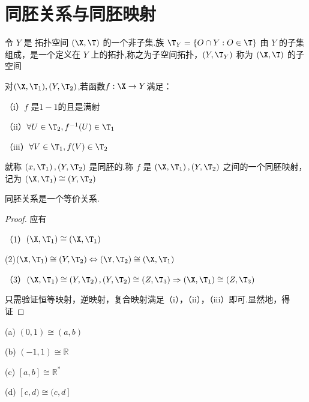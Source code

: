 \section{同胚关系与同胚映射}

\begin{definition}
	令 $Y$ 是 拓扑空间 $(\X, \T)$ 的一个非子集.族 $\T_Y=\{O \cap Y: O \in \T\}$ 由 $Y$ 的子集组成，是一个定义在 $Y$ 上的拓扑,称之为子空间拓扑，$\left(Y, \T_Y\right)$ 称为 $(\X, \T)$ 的子空间
\end{definition}
\begin{definition}
	对$(\X,\T_1),(Y,\T_2)$,若函数$f:\X\rightarrow Y$满足：
	
	（i）$f$ 是$1-1$的且是满射
	
	（ii）$\forall U \in \T_2, f^{-1}(U) \in \T_1$
	
	（iii）$\forall V \in \T_1, f(V) \in \T_2$
	
	就称 $\left(x, \T_1\right),\left(Y, \T_2\right)$ 是同胚的.称 $f$ 是 $\left(\X, \T_1\right),\left(Y, \T_2\right)$ 之间的一个同胚映射，记为 $\left(\X, \T_1\right)\cong\left(Y, \T_2\right)$
\end{definition}
\begin{proposition}
	同胚关系是一个等价关系.
\end{proposition}
\begin{proof}
	应有
	
	（1）$\left(\X, \T_1\right) \cong\left(\X, \T_1\right)$
	
	(2)$\left(\X, \T_1\right) \cong\left(Y, \T_2\right) \Leftrightarrow\left(\Y, \T_2\right) \cong\left(\X, \T_1\right)$
	
	（3）$\left(\X, \T_1\right) \cong\left(Y, \T_2\right),\left(Y, 
	\T_2\right) \cong\left(Z, \T_3\right) \Rightarrow\left(\X, \T_1\right) \cong\left(Z, \T_3\right)$
	
	只需验证恒等映射，逆映射，复合映射满足（i），（ii），（iii）即可.显然地，得证
\end{proof}
\begin{example}
	
	(a) $(0,1) \cong(a, b)$
	
	(b) $(-1,1) \cong \mathbb{R}$
	
	(c) $[a, b] \cong \mathbb{R}^*$
	
	(d) $[c, d) \cong(c, d]$
\end{example}
